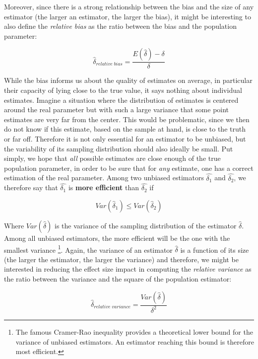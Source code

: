 \documentclass[
  man,floatsintext]{apa6}
\begin{document}
Moreover, since there is a strong relationship between the bias and the size of any estimator (the larger an estimator, the larger the bias), it might be interesting to also define the \emph{relative bias} as the ratio between the bias and the population parameter:

\begin{equation} 
\hat{\delta}_{relative \; bias}=\frac{E(\hat{\delta})-\delta}{\delta}
\label{eq:RELBIAS}
\end{equation}

While the bias informs us about the quality of estimates on average, in particular their capacity of lying close to the true value, it says nothing about individual estimates. Imagine a situation where the distribution of estimates is centered around the real parameter but with such a large variance that some point estimates are very far from the center. This would be problematic, since we then do not know if this estimate, based on the sample at hand, is close to the truth or far off. Therefore it is not only essential for an estimator to be unbiased, but the variability of its sampling distribution should also ideally be small. Put simply, we hope that \emph{all} possible estimates are close enough of the true population parameter, in order to be sure that for \emph{any} estimate, one has a correct estimation of the real parameter. Among two unbiased estimators \(\hat{\delta_1}\) and \(\hat{\delta_2}\), we therefore say that \(\hat{\delta_1}\) is \textbf{more efficient} than \(\hat{\delta_2}\) if

\begin{equation} 
Var(\hat{\delta}_1) \leq Var(\hat{\delta}_2)
\label{eq:EFFICIENCY}
\end{equation}

Where \(Var(\hat{\delta})\) is the variance of the sampling distribution of the estimator \(\hat{\delta}\). Among all unbiased estimators, the more efficient will be the one with the smallest variance \footnote{The famous Cramer-Rao inequality provides a theoretical lower bound for the variance of unbiased estimators. An estimator reaching this bound is therefore most efficient.}. Again, the variance of an estimator \(\hat{\delta}\) is a function of its size (the larger the estimator, the larger the variance) and therefore, we might be interested in reducing the effect size impact in computing the \emph{relative variance} as the ratio between the variance and the square of the population estimator:

\begin{equation} 
\hat{\delta}_{relative \; variance}=\frac{Var(\hat{\delta})}{\delta^2}
\label{eq:RELVAR}
\end{equation}
\end{document}
